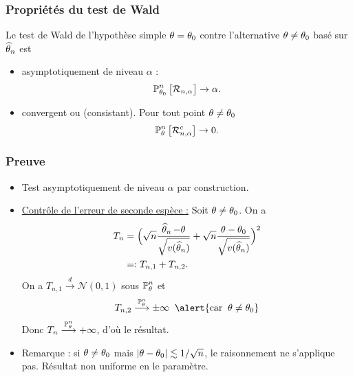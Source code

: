 \begin{frame}
\frametitle{Propriétés du test de Wald}
\begin{prop}
Le test de Wald de l'hypothèse simple $\theta=\theta_0$ contre l'alternative $\theta \neq \theta_0$ basé sur $\operatorname{\widehat \theta_{\mathnormal{n}}}$ est
\begin{itemize}
\item \alert{asymptotiquement} de niveau $\alpha$ :
$$\operatorname{{\mathbb P}}_{\theta_0}^n\big[ {\mathcal R}_{n,\alpha}\big]\rightarrow \alpha.$$
\item \alert{convergent ou (consistant)}. Pour tout point $\theta \neq \theta_0$
$$\operatorname{{\mathbb P}}_\theta^n\big[ {\mathcal R}_{n,\alpha}^c\big] \rightarrow 0.$$
\end{itemize}
\end{prop}
\end{frame}

\begin{frame}
\frametitle{Preuve}
\begin{itemize}
\item Test asymptotiquement de niveau $\alpha$ \alert{par construction}.
\item \underline{Contrôle de l'erreur de seconde espèce :}
Soit $\theta \neq \theta_0$. On a
\begin{align*}
T_n & = \Big(\sqrt{n}\frac{\operatorname{\widehat \theta_{\mathnormal{n}}}-\theta}{\sqrt{v(\operatorname{\widehat \theta_{\mathnormal{n}}})}}+\sqrt{n}\frac{\theta-\theta_0}{\sqrt{v(\operatorname{\widehat \theta_{\mathnormal{n}}})}}\Big)^2 \\
& =: T_{n,1}+T_{n,2}.
\end{align*}
On a $T_{n,1} \stackrel{d}{\longrightarrow} {\mathcal N}(0,1)$ sous $\operatorname{{\mathbb P}}_{\theta}^n$ et
$$T_{n,2} \stackrel{\PP_{\truetheta}^n}{\longrightarrow} \pm \infty\;\;\alert{\text{car}\;\;\truetheta \neq \truetheta_0}$$
Donc $T_{n}\stackrel{\operatorname{{\mathbb P}}_{\theta}^n}{\longrightarrow}+\infty$, d'où le résultat.
\item \alert{Remarque} : si $\theta \neq \theta_0$ mais $|\theta - \theta_0| \lesssim 1/\sqrt{n}$, le raisonnement ne s'applique pas. Résultat \alert{non uniforme en le paramètre}.
\end{itemize}
\end{frame}

